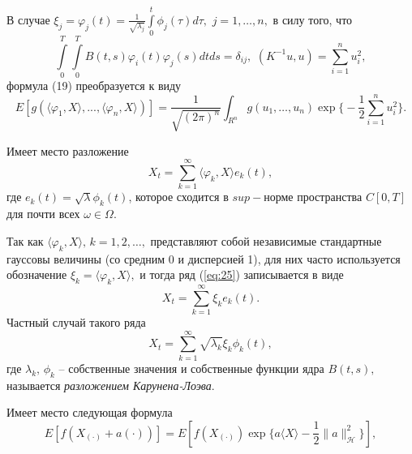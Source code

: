 \documentclass [a4paper, 12pt]{report}
\begin{document}
В случае $\xi_j=\varphi_j(t)=\frac{1}{\sqrt{\lambda_j}}
\int\limits_0^t \phi_j(\tau)d\tau, \,\, j=1,\ldots,n,$ в силу того, что
$$
\int\limits_0^T\int\limits_0^T B(t,s)\varphi_i(t)\varphi_j(s) dtds=\delta_{ij}, \,\,
(K^{-1}u,u)=\sum_{i=1}^{n}u_i^2,
$$
формула (19) преобразуется к виду
\begin{equation}\label{eq:24}
E[g(\langle\varphi_1,X\rangle,...,\langle\varphi_n,X\rangle)]=
\frac{1}{\sqrt{(2\pi)^n}}
\int_{R^n}g(u_1,\ldots,u_n)\exp\Big\{-\frac{1}{2}
\sum_{i=1}^{n}u_i^2\Big\}.
\end{equation}

Имеет место разложение
\begin{equation}\label{eq:25}
X_t=\sum\limits_{k=1}^\infty \langle\varphi_k, X\rangle e_k(t),
\end{equation}
где $e_k(t)=\sqrt{\lambda}\phi_k(t)$, которое
сходится в $sup-$норме пространства $C[0,T]$ для почти всех $\omega\in\Omega.$

Так как $\langle\varphi_k, X\rangle, \, k=1,2,\ldots,$ представляют собой
независимые стандартные гауссовы величины (со средним 0 и дисперсией 1),
для них часто используется обозначение $\xi_k=\langle\varphi_k, X\rangle,$
и тогда ряд (\ref{eq:25}) записывается в виде
\begin{equation}\label{eq:26}
X_t=\sum\limits_{k=1}^\infty \xi_k e_k(t).
\end{equation}
Частный случай такого ряда
\begin{equation}\label{eq:27}
X_t=\sum\limits_{k=1}^\infty \sqrt{\lambda_k}\xi_k \phi_k(t),
\end{equation}
где $\lambda_k, \, \phi_k $ -- собственные значения и собственные функции
ядра $B(t,s),$ называется \emph{разложением Карунена-Лоэва}.


Имеет место следующая формула
\begin{equation}\label{eq:28}
E[f(X_{(\cdot)}+a(\cdot))]=
E[f(X_{(\cdot)})\exp\{a\langle X\rangle-
\frac{1}{2}\|a\|_\mathcal{H}^2\}],
\end{equation}
\end{document}
